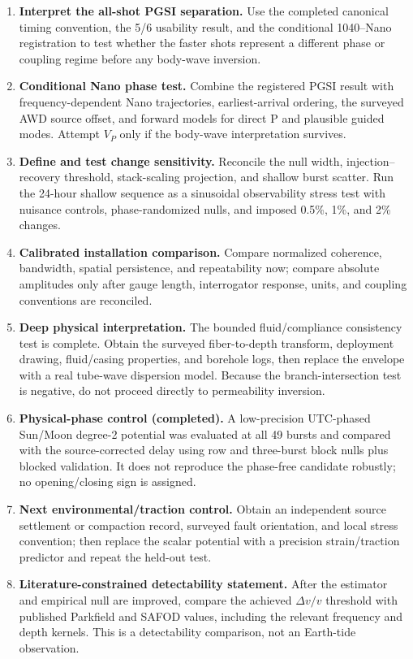 \documentclass[11pt]{article}
\begin{document}
\begin{enumerate}[leftmargin=*]
  \item \textbf{Interpret the all-shot PGSI separation.} Use the completed
  canonical timing convention, the 5/6 usability result, and the conditional
  1040--Nano registration to test whether the faster shots represent a different
  phase or coupling regime before any body-wave inversion.
  \item \textbf{Conditional Nano phase test.} Combine the registered PGSI result
  with frequency-dependent Nano trajectories, earliest-arrival ordering, the
  surveyed AWD source offset, and forward models for direct P and plausible
  guided modes. Attempt $V_P$ only if the body-wave interpretation survives.
  \item \textbf{Define and test change sensitivity.} Reconcile the null width,
  injection--recovery threshold, stack-scaling projection, and shallow burst
  scatter.  Run the 24-hour shallow sequence as a sinusoidal observability
  stress test with nuisance controls, phase-randomized nulls, and imposed
  0.5\%, 1\%, and 2\% changes.
  \item \textbf{Calibrated installation comparison.} Compare normalized
  coherence, bandwidth, spatial persistence, and repeatability now; compare
  absolute amplitudes only after gauge length, interrogator response, units, and
  coupling conventions are reconciled.
  \item \textbf{Deep physical interpretation.} The bounded fluid/compliance
  consistency test is complete.  Obtain the surveyed fiber-to-depth transform,
  deployment drawing, fluid/casing properties, and borehole logs, then replace
  the envelope with a real tube-wave dispersion model.  Because the
  branch-intersection test is negative, do not proceed directly to permeability
  inversion.
  \item \textbf{Physical-phase control (completed).} A low-precision UTC-phased
  Sun/Moon degree-2 potential was evaluated at all 49 bursts and compared with
  the source-corrected delay using row and three-burst block nulls plus blocked
  validation. It does not reproduce the phase-free candidate robustly; no
  opening/closing sign is assigned.
  \item \textbf{Next environmental/traction control.} Obtain an independent source
  settlement or compaction record, surveyed fault orientation, and local stress
  convention; then replace the scalar potential with a precision strain/traction
  predictor and repeat the held-out test.
  \item \textbf{Literature-constrained detectability statement.} After the
  estimator and empirical null are improved, compare the achieved $\Delta v/v$
  threshold with published Parkfield and SAFOD values, including the relevant
  frequency and depth kernels.  This is a detectability comparison, not an
  Earth-tide observation.
\end{enumerate}
\end{document}
